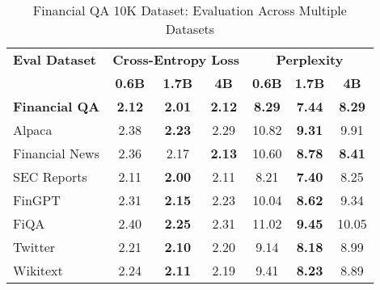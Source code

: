 
\begin{table}[htbp]
\centering
\caption[Financial QA 10K: Evaluation Results]{Financial QA 10K Dataset: Evaluation Across Multiple Datasets}
\label{tab:financial_qa_results}
\begin{tabular}{l|ccc|ccc}
\hline
\textbf{Eval Dataset} & \multicolumn{3}{c|}{\textbf{Cross-Entropy Loss}} & \multicolumn{3}{c}{\textbf{Perplexity}} \\
\cline{2-4} \cline{5-7}
  & \textbf{0.6B} & \textbf{1.7B} & \textbf{4B} & \textbf{0.6B} & \textbf{1.7B} & \textbf{4B} \\
\textbf{Financial QA} & \textbf{2.12} & \textbf{2.01} & \textbf{2.12} & \textbf{8.29} & \textbf{7.44} & \textbf{8.29} \\
Alpaca & 2.38 & \textbf{2.23} & 2.29 & 10.82 & \textbf{9.31} & 9.91 \\
Financial News & 2.36 & 2.17 & \textbf{2.13} & 10.60 & \textbf{8.78} & \textbf{8.41} \\
SEC Reports & 2.11 & \textbf{2.00} & 2.11 & 8.21 & \textbf{7.40} & 8.25 \\
FinGPT & 2.31 & \textbf{2.15} & 2.23 & 10.04 & \textbf{8.62} & 9.34 \\
FiQA & 2.40 & \textbf{2.25} & 2.31 & 11.02 & \textbf{9.45} & 10.05 \\
Twitter & 2.21 & \textbf{2.10} & 2.20 & 9.14 & \textbf{8.18} & 8.99 \\
Wikitext & 2.24 & \textbf{2.11} & 2.19 & 9.41 & \textbf{8.23} & 8.89 \\
\hline
\end{tabular}
\end{table}
